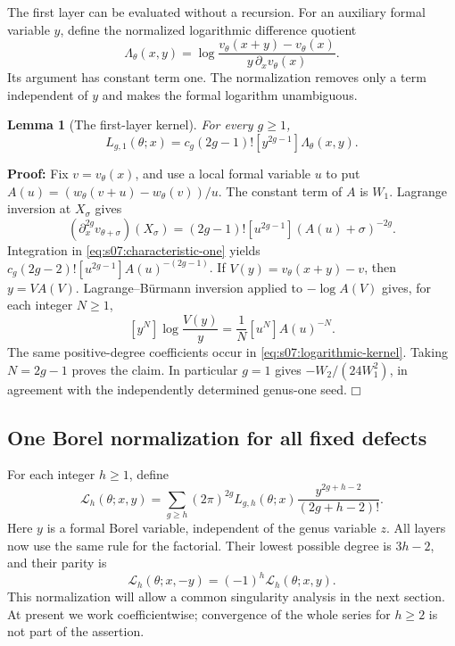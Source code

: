 \documentclass[a4paper,10pt]{article}
\numberwithin{equation}{section}
\theoremstyle{paperplain}
\newtheorem{lmm}[thm]{Lemma}
\theoremstyle{paperremark}
\theoremstyle{paperplain}
\newenvironment{prf}{\noindent \textbf{Proof: }}{\hfill $\mdlgwhtsquare$\par\addvspace{0.5\baselineskip}}
\begin{document}
The first layer can be evaluated without a recursion. For an
auxiliary formal variable $y$, define the normalized logarithmic
difference quotient
\begin{equation}\label{eq:s07:logarithmic-kernel}
 \Lambda_\theta(x,y)
 =\log\frac{v_\theta(x+y)-v_\theta(x)}
                  {y\,\partial_xv_\theta(x)}.
\end{equation}
Its argument has constant term one. The normalization removes only
a term independent of $y$ and makes the formal logarithm unambiguous.

\begin{lmm}[The first-layer kernel]\label{lmm:s07:first-kernel}
For every $g\geq1$,
\begin{equation}\label{eq:s07:first-kernel}
 L_{g,1}(\theta;x)
 =c_g(2g-1)![y^{2g-1}]\Lambda_\theta(x,y).
\end{equation}
\end{lmm}
\begin{prf}
Fix $v=v_\theta(x)$, and use a local formal variable $u$ to put
$A(u)=(w_\theta(v+u)-w_\theta(v))/u$.
The constant term of $A$ is $W_1$. Lagrange inversion at
$X_\sigma$ gives
\[
 (\partial_x^{2g}v_{\theta+\sigma})(X_\sigma)
 =(2g-1)![u^{2g-1}](A(u)+\sigma)^{-2g}.
\]
Integration in \eqref{eq:s07:characteristic-one} yields
$c_g(2g-2)![u^{2g-1}]A(u)^{-(2g-1)}$.
If $V(y)=v_\theta(x+y)-v$, then $y=V A(V)$.
Lagrange--B\"urmann inversion applied to $-\log A(V)$ gives,
for each integer $N\geq1$,
\[
 [y^N]\log\frac{V(y)}y
                 =\frac1N[u^N]A(u)^{-N}.
\]
The same positive-degree coefficients occur in
\eqref{eq:s07:logarithmic-kernel}. Taking $N=2g-1$ proves the
claim. In particular $g=1$ gives $-W_2/(24W_1^2)$, in agreement
with the independently determined genus-one seed.
\end{prf}

\subsection{One Borel normalization for all fixed defects}
\label{subsec:s07:04}

For each integer $h\geq1$, define
\begin{equation}\label{eq:s07:borel}
 \mathcal L_h(\theta;x,y)
 =\sum_{g\geq h}(2\pi)^{2g}L_{g,h}(\theta;x)
                         \frac{y^{2g+h-2}}{(2g+h-2)!}.
\end{equation}
Here $y$ is a formal Borel variable, independent of the genus variable
$z$. All layers now use the same rule for the factorial. Their lowest
possible degree is
$3h-2$, and their parity is
\begin{equation}\label{eq:s07:borel-parity}
 \mathcal L_h(\theta;x,-y)=(-1)^h\mathcal L_h(\theta;x,y).
\end{equation}
This normalization will allow a common singularity analysis in the
next section. At present we work coefficientwise; convergence of the
whole series for $h\geq2$ is not part of the assertion.
\end{document}
